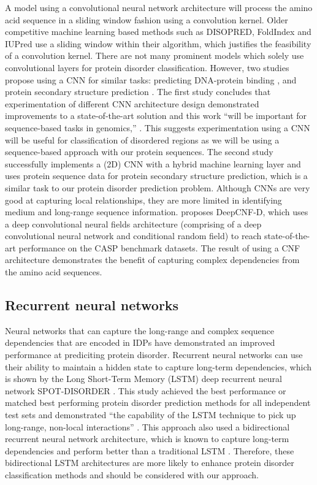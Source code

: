 \documentclass{l4proj}
\begin{document}
A model using a convolutional neural network architecture will process the amino acid sequence in a sliding window fashion using a convolution kernel. Older competitive machine learning based methods such as DISOPRED, FoldIndex and IUPred use a sliding window within their algorithm, which justifies the feasibility of a convolution kernel. There are not many prominent models which solely use convolutional layers for protein disorder classification. However, two studies propose using a CNN for similar tasks: predicting DNA-protein binding \citep{Zeng:16}, and protein secondary structure prediction \citep{Ema:22}. The first study concludes that experimentation of different CNN architecture design demonstrated improvements to a state-of-the-art solution and this work “will be important for sequence-based tasks in genomics,” \citep{Zeng:16}. This suggests experimentation using a CNN will be useful for classification of disordered regions as we will be using a sequence-based approach with our protein sequences. The second study successfully implements a (2D) CNN with a hybrid machine learning layer and uses protein sequence data for protein secondary structure prediction, which is a similar task to our protein disorder prediction problem. Although CNNs are very good at capturing local relationships, they are more limited in identifying medium and long-range sequence information. \cite{Wang:15} proposes DeepCNF-D, which uses a deep convolutional neural fields architecture (comprising of a deep convolutional neural network and conditional random field) to reach state-of-the-art performance on the CASP benchmark datasets. The result of using a CNF architecture demonstrates the benefit of capturing complex dependencies from the amino acid sequences.

\subsection{Recurrent neural networks}
\label{chap:background sec:litrevRNN}

Neural networks that can capture the long-range and complex sequence dependencies that are encoded in IDPs have demonstrated an improved performance at prediciting protein disorder. Recurrent neural networks can use their ability to maintain a hidden state to capture long-term dependencies, which is shown by the Long Short-Term Memory (LSTM) deep recurrent neural network SPOT-DISORDER \citep{Hanson:16}. This study achieved the best performance or matched best performing protein disorder prediction methods for all independent test sets and demonstrated “the capability of the LSTM technique to pick up long-range, non-local interactions” \citep{Hanson:16}. This approach also used a bidirectional recurrent neural network architecture, which is known to capture long-term dependencies and perform better than a traditional LSTM \citep{Graves:05}. Therefore, these bidirectional LSTM architectures are more likely to enhance protein disorder classification methods and should be considered with our approach.
\end{document}
